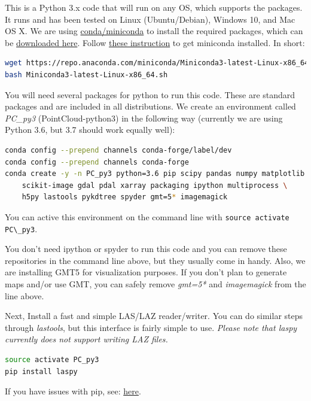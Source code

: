 \documentclass[a4paperpaper,,tablecaptionabove]{scrartcl}
\newcommand{\passthrough}[1]{#1}
\begin{document}
This is a Python 3.x code that will run on any OS, which supports the
packages. It runs and has been tested on Linux (Ubuntu/Debian), Windows
10, and Mac OS X. We are using
\href{https://conda.io/docs/}{conda/miniconda} to install the required
packages, which can be \href{https://conda.io/miniconda.html}{downloaded
here}. Follow
\href{https://conda.io/docs/user-guide/install/index.html}{these
instruction} to get miniconda installed. In short:

\begin{lstlisting}[language=bash]
wget https://repo.anaconda.com/miniconda/Miniconda3-latest-Linux-x86_64.sh
bash Miniconda3-latest-Linux-x86_64.sh
\end{lstlisting}

You will need several packages for python to run this code. These are
standard packages and are included in all distributions. We create an
environment called \emph{PC\_py3} (PointCloud-python3) in the following
way (currently we are using Python 3.6, but 3.7 should work equally
well):

\begin{lstlisting}[language=bash]
conda config --prepend channels conda-forge/label/dev
conda config --prepend channels conda-forge
conda create -y -n PC_py3 python=3.6 pip scipy pandas numpy matplotlib \
    scikit-image gdal pdal xarray packaging ipython multiprocess \
    h5py lastools pykdtree spyder gmt=5* imagemagick
\end{lstlisting}

You can active this environment on the command line with
\passthrough{\lstinline!source activate PC\_py3!}.

You don't need ipython or spyder to run this code and you can remove
these repositories in the command line above, but they usually come in
handy. Also, we are installing GMT5 for visualization purposes. If you
don't plan to generate maps and/or use GMT, you can safely remove
\emph{gmt=5*} and \emph{imagemagick} from the line above.

Next, Install a fast and simple LAS/LAZ reader/writer. You can do
similar steps through \emph{lastools}, but this interface is fairly
simple to use. \emph{Please note that laspy currently does not support
writing LAZ files.}

\begin{lstlisting}[language=bash]
source activate PC_py3
pip install laspy
\end{lstlisting}

If you have issues with pip, see:
\href{https://stackoverflow.com/questions/47955397/pip3-error-namespacepath-object-has-no-attribute-sor}{here}.
\end{document}

